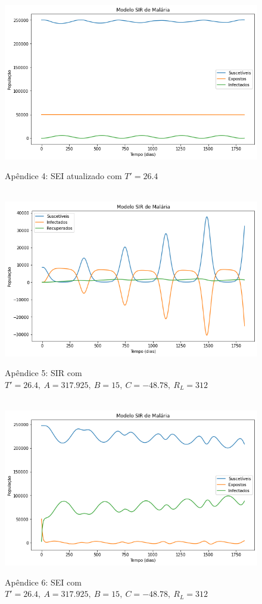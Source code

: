 \documentclass[12pt]{article}
\begin{document}
\begin{figure}[!ht]
        \centering
        \hbox{\hspace{2.0em} \includegraphics[scale=0.55] {SEI_a_correto.png}}
        \caption*{Apêndice 4: SEI atualizado com $T'=26.4$}
\end{figure}
\newpage
\begin{figure}[!ht]
        \centering
        \hbox{\hspace{2.0em} \includegraphics[scale=0.55] {SIR_Correcao_b3.png}}
        \caption*{Apêndice 5: SIR com $T'=26.4, \ A=317.925, \ B=15, \ C=-48.78, \ R_L=312$}
\end{figure} 
\begin{figure}[!ht]
        \centering
        \hbox{\hspace{2.0em} \includegraphics[scale=0.55] {SEI_Correcao_b3.png}}
        \caption*{Apêndice 6: SEI com $T'=26.4, \ A=317.925, \ B=15, \ C=-48.78, \ R_L=312$}
\end{figure}
\end{document}
